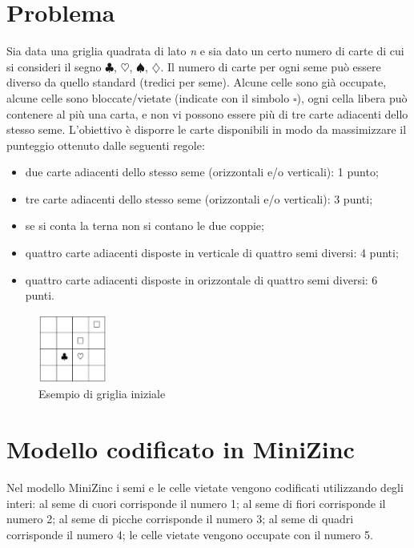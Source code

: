 \documentclass[12pt]{article}
\begin{document}
    \section{Problema}\label{sec:Problema}
    Sia data una griglia quadrata di lato \emph{n} e sia dato un certo numero di carte di cui si consideri il segno $\clubsuit$, $\heartsuit$, $\spadesuit$, $\diamondsuit$.
    Il numero di carte per ogni seme può essere diverso da quello standard (tredici per seme).
    Alcune celle sono già occupate, alcune celle sono bloccate/vietate (indicate con il simbolo $\square$), ogni cella libera può contenere al più una carta, e non vi possono essere più di tre carte adiacenti dello stesso seme.
    L'obiettivo è disporre le carte disponibili in modo da massimizzare il punteggio ottenuto dalle seguenti regole:
    \begin{itemize}
        \item due carte adiacenti dello stesso seme (orizzontali e/o verticali): 1 punto;
        \item tre carte adiacenti dello stesso seme (orizzontali e/o verticali): 3 punti;
        \item se si conta la terna non si contano le due coppie;
        \item quattro carte adiacenti disposte in verticale di quattro semi diversi: 4 punti;
        \item quattro carte adiacenti disposte in orizzontale di quattro semi diversi: 6 punti.
    \end{itemize}

    \begin{figure}[h]
        \centering
        \includegraphics[width=0.2\textwidth]{img/grid_example}
        \caption{Esempio di griglia iniziale}
        \label{fig:grid_ex}
    \end{figure}

    \section{Modello codificato in MiniZinc}\label{sec:modello-codificato-in-minizinc}
    Nel modello MiniZinc i semi e le celle vietate vengono codificati utilizzando degli interi: al seme di cuori corrisponde il numero 1; al seme di fiori corrisponde il numero 2; al seme di picche corrisponde il numero 3; al seme di quadri corrisponde il numero 4; le celle vietate vengono occupate con il numero 5.
\end{document}
